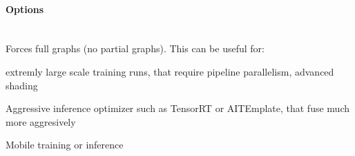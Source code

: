 \paragraph{Options}\label{para:options}
\begin{optionsbox}\nospacing
    \begin{option}[\pythoninline{nopython=True}]\label{option:nopython_true}\leavevmode\\
        Forces full graphs (no partial graphs).
        This can be useful for:
        \begin{itemizenosep}
            \item extremly large scale training runs, that require pipeline parallelism, advanced shading
            \item Aggressive inference optimizer such as TensorRT or AITEmplate, that fuse much more aggresively
            \item Mobile training or inference
        \end{itemizenosep}
    \end{option}
\end{optionsbox}


